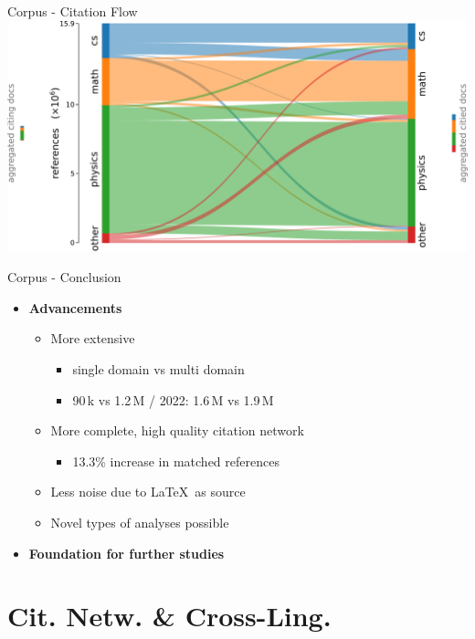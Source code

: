\documentclass[en,16:9,smallfoot]{sdqbeamer}
\begin{document}
   \begin{frame}{Corpus - Citation Flow}
    \centering
    \includegraphics[width=.7\textwidth]{imgs/unarXive_citflow_sankey}
   \end{frame}

   \begin{frame}{Corpus - Conclusion}
        \begin{itemize}
        \item \textbf{Advancements}
            \begin{itemize}
            \item More extensive
            \begin{itemize}
                \item single domain vs multi domain
                \item 90\,k vs 1.2\,M {\color{lightgrey}/ 2022: 1.6\,M vs 1.9\,M}
            \end{itemize}
            \item More complete, high quality citation network
            \begin{itemize}
                \item 13.3\% increase in matched references
            \end{itemize}
            \item Less noise due to \LaTeX\ as source
            \item Novel types of analyses possible
            \end{itemize}
        \item \textbf{Foundation for further studies}
        \end{itemize}
   \end{frame}


\section{Cit. Netw. \& Cross-Ling.}
\end{document}

